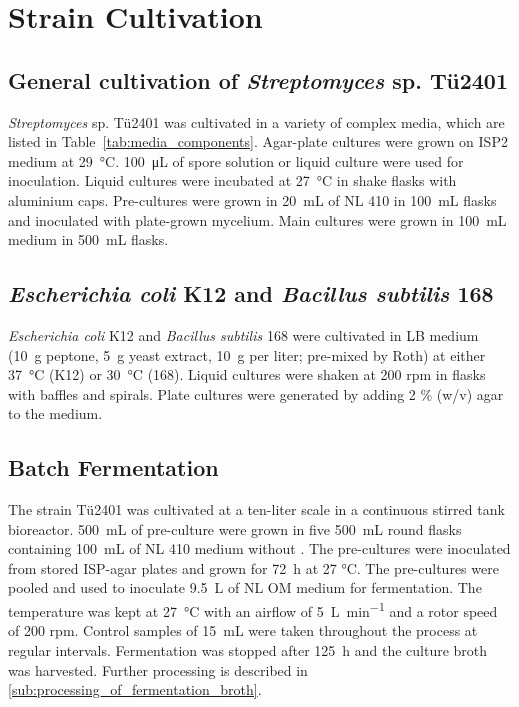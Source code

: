 \section{Strain Cultivation} %
\label{sec:strain_cultivation}

	\subsection{General cultivation of \emph{Streptomyces} sp. T\"u2401} %
	\label{sub:streptomyces_sp_t}
		\emph{Streptomyces} sp. T\"u2401 was cultivated in a variety of complex media, which are listed in Table~\ref{tab:media_components}. Agar-plate cultures were grown on ISP2 medium at \SI{29}{\celsius}. \SI{100}{\micro\liter} of spore solution or liquid culture were used for inoculation. Liquid cultures were incubated at \SI{27}{\celsius} in shake flasks with aluminium caps. Pre-cultures were grown in \SI{20}{\milli\liter} of NL 410 in \SI{100}{\milli\liter} flasks and inoculated with plate-grown mycelium. Main cultures were grown in \SI{100}{\milli\liter} medium in \SI{500}{\milli\liter} flasks.

	\subsection{\emph{Escherichia coli} K12 and \emph{Bacillus subtilis} 168} %
	\label{sub:escherichia_coli_k12}
		\emph{Escherichia coli} K12 and \emph{Bacillus subtilis} 168 were cultivated in LB medium (\SI{10}{\gram} peptone, \SI{5}{\gram} yeast extract, \SI{10}{\gram}  per liter; pre-mixed by Roth) at either \SI{37}{\celsius} (K12) or \SI{30}{\celsius} (168). Liquid cultures were shaken at 200 rpm in flasks with baffles and spirals. Plate cultures were generated by adding 2 \% (w/v) agar to the medium.

	\subsection{Batch Fermentation} %
	\label{sub:fermentation}
	The strain T\"u2401 was cultivated at a ten-liter scale in a continuous stirred tank bioreactor. \SI{500}{\milli\liter} of pre-culture were grown in five \SI{500}{\milli\liter} round flasks containing \SI{100}{\milli\liter} of NL 410 medium without . The pre-cultures were inoculated from stored ISP-agar plates and grown for \SI{72}{\hour} at 27 \si{\celsius}. The pre-cultures were pooled and used to inoculate \SI{9.5}{\liter} of NL OM medium for fermentation. The temperature was kept at \SI{27}{\celsius} with an airflow of \SI{5}{\liter\per\minute} and a rotor speed of 200 rpm. Control samples of \SI{15}{\milli\liter} were taken throughout the process at regular intervals. Fermentation was stopped after \SI{125}{\hour} and the culture broth was harvested. Further processing is described in \ref{sub:processing_of_fermentation_broth}.
	
